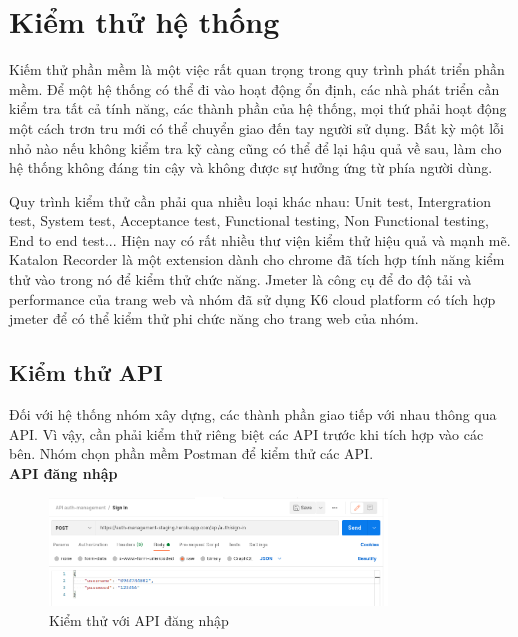 \chapter{Kiểm thử hệ thống}\label{chap:testing}
		Kiếm thử phần mềm là một việc rất quan trọng trong quy trình phát triển phần mềm.
        Để một hệ thống có thể đi vào hoạt động ổn định, các nhà phát triển cần kiểm tra tất
        cả tính năng, các thành phần của hệ thống, mọi thứ phải hoạt động một cách trơn tru
        mới có thể chuyển giao đến tay người sử dụng. Bất kỳ một lỗi nhỏ nào nếu không kiểm
        tra kỹ càng cũng có thể để lại hậu quả về sau, làm cho hệ thống không đáng tin cậy và
        không được sự hưởng ứng từ phía người dùng.
        
        Quy trình kiểm thử cần phải qua nhiều loại khác nhau: Unit test, Intergration test, System test, Acceptance test, Functional testing, Non Functional testing, End to end test... Hiện nay có rất nhiều thư viện kiểm thử hiệu quả và mạnh mẽ. Katalon Recorder là một extension dành cho chrome đã tích hợp tính năng kiểm thử vào trong nó để kiểm thử chức năng. Jmeter là công cụ để đo độ tải và performance của trang web và nhóm đã sử dụng K6 cloud platform có tích hợp jmeter để có thể kiểm thử phi chức năng cho trang web của nhóm.
		\section{Kiểm thử API}
		Đối với hệ thống nhóm xây dựng, các thành phần giao tiếp với nhau thông qua API. Vì vậy, cần phải kiểm thử riêng biệt các API trước khi tích hợp vào các bên. Nhóm chọn phần mềm Postman để kiểm thử các API.\\
		
		\textbf{API đăng nhập}
		
		\begin{figure}[!ht]
			\includegraphics[width=0.8\textwidth]{Images/testing/API-sign-in.png}
			\centering
			\linebreak
			\caption{Kiểm thử với API đăng nhập}
		\end{figure}
		
		\newpage

